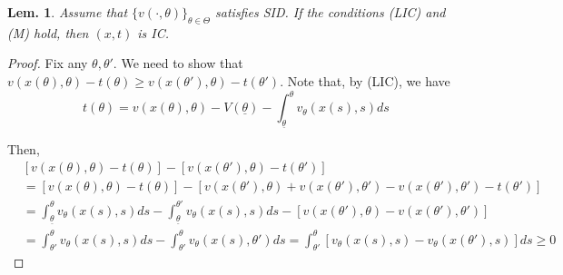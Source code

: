\documentclass[11pt,a4paper,dvipdfmx]{article}
\theoremstyle{plain}
\newtheorem{lem}{Lem.}[section]
\newcommand{\1}{\mathbbm{1}}
\begin{document}
\begin{lem}
	Assume that $\{v(\cdot, \theta)\}_{\theta \in \Theta}$ satisfies SID. If the conditions (LIC) and (M) hold, then $(x,t)$ is IC.
\end{lem}
\begin{proof}
	Fix any $\theta, \theta'$. We need to show that $v(x(\theta), \theta) - t(\theta) \geq v(x(\theta'), \theta) - t(\theta')$.
	Note that, by (LIC), we have 
	\[
	t(\theta) = v(x(\theta), \theta) - V(\underline{\theta}) - \int_{\underline{\theta}}^\theta
	 v_\theta(x(s), s) ds
	\]
	
	Then,
	\begin{align*}
		&[v(x(\theta), \theta) - t(\theta)] - [v(x(\theta'), \theta) - t(\theta')] \\
		&=
		[v(x(\theta), \theta) - t(\theta)] - [v(x(\theta'), \theta) + v(x(\theta'), \theta') - v(x(\theta'), \theta') - t(\theta')] \\
		&=
		\int_{\underline{\theta}}^\theta v_\theta(x(s), s) ds
		- \int_{\underline{\theta}}^{\theta'} v_\theta(x(s), s) ds
		- [v(x(\theta'), \theta) - v(x(\theta'), \theta')] \\
		&= \int_{\theta'}^\theta v_\theta(x(s), s) ds
		- \int_{\theta'}^\theta v_\theta(x(s), \theta') ds
		= \int_{\theta'}^\theta [v_\theta(x(s), s) - v_\theta(x(\theta'), s)] ds \geq 0
	\end{align*}
\end{proof}
\end{document}
